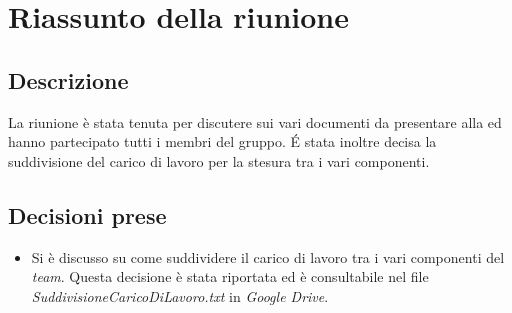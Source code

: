 \section{Riassunto della riunione}
\subsection{Descrizione}

La riunione è stata tenuta per discutere sui vari documenti da presentare alla \RR{} ed hanno partecipato tutti i membri del gruppo. \'E stata inoltre decisa la suddivisione del carico di lavoro per la stesura tra i vari componenti. 

\subsection{Decisioni prese}
\begin{itemize}
\item Si è discusso su come suddividere il carico di lavoro tra i vari componenti del \textit{team}. Questa decisione è stata riportata ed è consultabile nel file \textit{SuddivisioneCaricoDiLavoro.txt} in \textit{Google Drive}.
\end{itemize}
